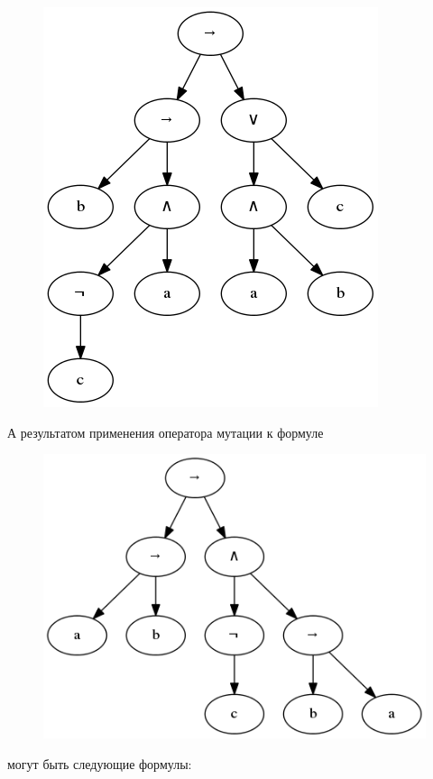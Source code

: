 \documentclass[12pt,fleqn]{article}
\begin{document}
\begin{figure}[!h]
\begin{minipage}{1.5in}
    \includegraphics[scale=0.3]{t5.png}
  \end{minipage}%
\end{figure}

\FloatBarrier

А результатом применения оператора мутации к формуле

\FloatBarrier

\begin{figure}[!h]
  \centering
  \includegraphics[scale=0.3]{t6.png}
\end{figure}

\FloatBarrier

могут быть следующие формулы:
\end{document}
